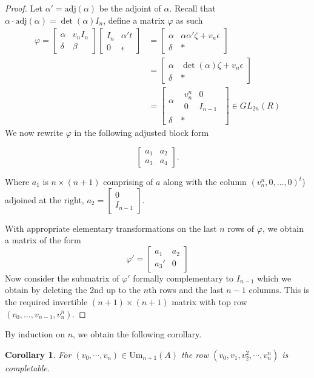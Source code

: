 \documentclass[12pt]{report}
\numberwithin{equation}{section}
\newcounter{dummy} \numberwithin{dummy}{section}
\newtheorem{corollary}[dummy]{Corollary}
\begin{document}
\begin{proof}
	 Let $\alpha' = \text{adj}(\alpha)$ be the adjoint of $\alpha$. Recall that $\alpha \cdot \mathrm{adj}(\alpha )= \det (\alpha) I_n$, define a matrix $\varphi$ as such
		\begin{align*}
			\varphi = \begin{bmatrix} \alpha & v_nI_n \\ \delta & \beta \end{bmatrix} \begin{bmatrix} I_n & \alpha't \\ 0 & \epsilon \end{bmatrix} &= \begin{bmatrix} \alpha & \alpha \alpha' \zeta + v_n \epsilon  \\ \delta & * \end{bmatrix}\\
			&= \begin{bmatrix} \alpha & \det(\alpha) \zeta + v_n \epsilon \\ \delta & * \end{bmatrix} \\
			&= \left[ \begin{array}{c|c}
				\alpha & \begin{matrix}
					v_n^n & 0\\
					0 & I_{n-1}
				\end{matrix}\\ \hline
				\delta & *
			\end{array} \right ]\in GL_{2n}(R) 
		\end{align*}
		We now rewrite $\varphi$ in the following adjusted block form
		
		\[\begin{bmatrix} a_1 & a_2 \\ a_3 & a_4 \end{bmatrix}.\] 
		
		Where $a_1$ is $n \times (n+1)$ comprising of $a$ along with the column $(v_n^n, 0, \ldots, 0)^t$) adjoined at the right, $a_2 = \begin{bmatrix} 0 \\ I_{n-1} \end{bmatrix}$. 
		
		With appropriate elementary transformations on the last $n$ rows of $\varphi$, we obtain a matrix of the form
		\[\varphi' = \begin{bmatrix} a_1 & a_2 \\ a_3' & 0 \end{bmatrix}\]
		Now consider the submatrix of $\varphi'$ formally complementary to $I_{n-1}$ which we obtain by deleting the $2$nd up to the $n$th rows and the last $n-1$ columns. This is the required invertible $(n+1) \times (n+1)$ matrix with top row $(v_0,\ldots,v_{n-1},v_n^n)$.

		
	\end{proof}
	By induction on $n$, we obtain the following corollary.
	\begin{corollary}\label{corprefactorial}
		For $(v_0, \cdots, v_n) \in \mathrm{Um}_{n+1}(A)$ the row $(v_0, v_1, v_2^2, \cdots, v_n^n)$ is completable.
	\end{corollary}
	
\end{document}
